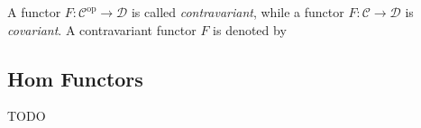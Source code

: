 A functor $F : \mathcal{C}^{\operatorname{op}} \to \mathcal{D}$ is called \textit{contravariant}, while
a functor $F : \mathcal{C} \to \mathcal{D}$ is \textit{covariant}. A contravariant functor $F$ is denoted by

\subsection{Hom Functors}
TODO
